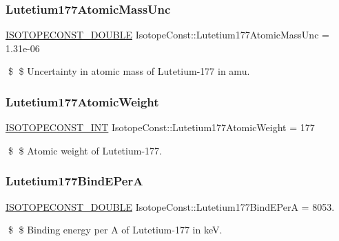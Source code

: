 \subsubsection{\texorpdfstring{Lutetium177\+Atomic\+Mass\+Unc}{Lutetium177AtomicMassUnc}}
{\footnotesize\ttfamily \mbox{\hyperlink{group___isotope_const-_macros_ga8f45a7272ce02c0b4c65c44636ed719a}{I\+S\+O\+T\+O\+P\+E\+C\+O\+N\+S\+T\+\_\+\+D\+O\+U\+B\+LE}} Isotope\+Const\+::\+Lutetium177\+Atomic\+Mass\+Unc = 1.\+31e-\/06}

\$ \$ Uncertainty in atomic mass of Lutetium-\/177 in amu. \mbox{\label{group___isotope_const-_lutetium-_lu177_ga48cc25429bcd0142e546bbd2a7e0170b}} 
\subsubsection{\texorpdfstring{Lutetium177\+Atomic\+Weight}{Lutetium177AtomicWeight}}
{\footnotesize\ttfamily \mbox{\hyperlink{group___isotope_const-_macros_ga5f18360b3e99483a35c32d789e62621c}{I\+S\+O\+T\+O\+P\+E\+C\+O\+N\+S\+T\+\_\+\+I\+NT}} Isotope\+Const\+::\+Lutetium177\+Atomic\+Weight = 177}

\$ \$ Atomic weight of Lutetium-\/177. \mbox{\label{group___isotope_const-_lutetium-_lu177_ga8eec48031f0aa691b84659774809b0f8}} 
\subsubsection{\texorpdfstring{Lutetium177\+Bind\+E\+PerA}{Lutetium177BindEPerA}}
{\footnotesize\ttfamily \mbox{\hyperlink{group___isotope_const-_macros_ga8f45a7272ce02c0b4c65c44636ed719a}{I\+S\+O\+T\+O\+P\+E\+C\+O\+N\+S\+T\+\_\+\+D\+O\+U\+B\+LE}} Isotope\+Const\+::\+Lutetium177\+Bind\+E\+PerA = 8053.}

\$ \$ Binding energy per A of Lutetium-\/177 in keV. \mbox{\label{group___isotope_const-_lutetium-_lu177_ga83abeaecb262d1f1f7642061a84146c3}} 
